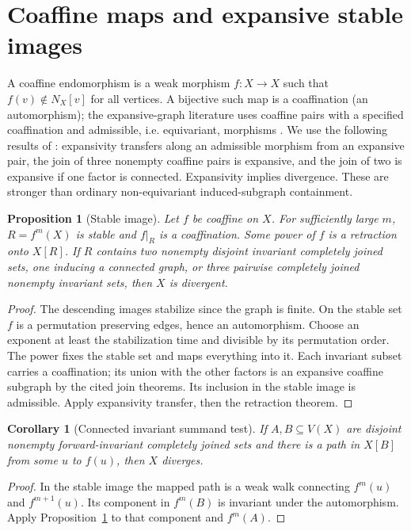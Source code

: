 \documentclass[11pt,a4paper]{article}
\newtheorem{proposition}[theorem]{Proposition}
\newtheorem{corollary}[theorem]{Corollary}
\theoremstyle{definition}\newtheorem{definition}[theorem]{Definition}\newtheorem{example}[theorem]{Example}
\theoremstyle{remark}\newtheorem{remark}[theorem]{Remark}
\begin{document}
\section{Coaffine maps and expansive stable images}\label{sec:coaffine}
A coaffine endomorphism is a weak morphism \(f:X\to X\) such that \(f(v)\notin N_X[v]\) for all vertices. A bijective such map is a coaffination (an automorphism); the expansive-graph literature uses coaffine pairs with a specified coaffination and admissible, i.e. equivariant, morphisms \cite{expansive,relations}. We use the following results of \cite[Theorems 2.4, 3.6, 4.6]{expansive}: expansivity transfers along an admissible morphism from an expansive pair, the join of three nonempty coaffine pairs is expansive, and the join of two is expansive if one factor is connected. Expansivity implies divergence. These are stronger than ordinary non-equivariant induced-subgraph containment.
\begin{proposition}[Stable image]\label{prop:stable}
Let \(f\) be coaffine on \(X\). For sufficiently large \(m\), \(R=f^m(X)\) is stable and \(f|_R\) is a coaffination. Some power of \(f\) is a retraction onto \(X[R]\). If \(R\) contains two nonempty disjoint invariant completely joined sets, one inducing a connected graph, or three pairwise completely joined nonempty invariant sets, then \(X\) is divergent.
\end{proposition}
\begin{proof}
The descending images stabilize since the graph is finite. On the stable set \(f\) is a permutation preserving edges, hence an automorphism. Choose an exponent at least the stabilization time and divisible by its permutation order. The power fixes the stable set and maps everything into it. Each invariant subset carries a coaffination; its union with the other factors is an expansive coaffine subgraph by the cited join theorems. Its inclusion in the stable image is admissible. Apply expansivity transfer, then the retraction theorem.
\end{proof}
\begin{corollary}[Connected invariant summand test]
If \(A,B\subseteq V(X)\) are disjoint nonempty forward-invariant completely joined sets and there is a path in \(X[B]\) from some \(u\) to \(f(u)\), then \(X\) diverges.
\end{corollary}
\begin{proof}
In the stable image the mapped path is a weak walk connecting \(f^m(u)\) and \(f^{m+1}(u)\). Its component in \(f^m(B)\) is invariant under the automorphism. Apply Proposition~\ref{prop:stable} to that component and \(f^m(A)\).
\end{proof}
\end{document}
